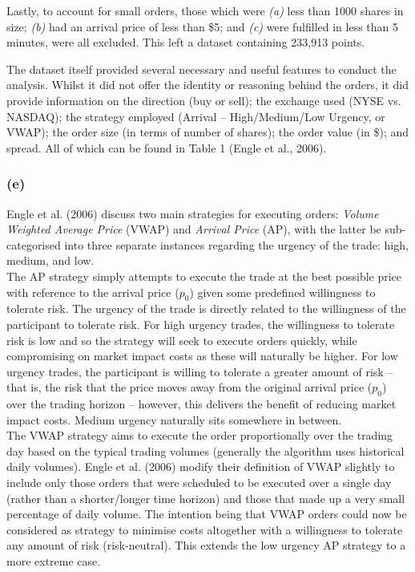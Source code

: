 \documentclass{article}
\begin{document}
Lastly, to account for small orders, those which were \textit{(a)} less than 1000 shares in size; \textit{(b)} had an arrival price of less than \$5; and \textit{(c)} were fulfilled in less than 5 minutes, were all excluded. This left a dataset containing 233,913 points. 

The dataset itself provided several necessary and useful features to conduct the analysis. Whilst it did not offer the identity or reasoning behind the orders, it did provide information on the direction (buy or sell); the exchange used (NYSE vs. NASDAQ); the strategy employed (Arrival – High/Medium/Low Urgency, or VWAP); the order size (in terms of number of shares); the order value (in \$); and spread. All of which can be found in Table 1 (Engle et al., 2006). \\


\subsubsection*{(e)}
Engle et al. (2006) discuss two main strategies for executing orders: \textit{Volume Weighted Average Price} (VWAP) and \textit{Arrival Price} (AP), with the latter be sub-categorised into three separate instances regarding the urgency of the trade: high, medium, and low. \\

The AP strategy simply attempts to execute the trade at the best possible price with reference to the arrival price ($p_0$) given some predefined willingness to tolerate risk. The urgency of the trade is directly related to the willingness of the participant to tolerate risk. For high urgency trades, the willingness to tolerate risk is low and so the strategy will seek to execute orders quickly, while compromising on market impact costs as these will naturally be higher. For low urgency trades, the participant is willing to tolerate a greater amount of risk – that is, the risk that the price moves away from the original arrival price ($p_0$) over the trading horizon – however, this delivers the benefit of reducing market impact costs. Medium urgency naturally sits somewhere in between. \\

The VWAP strategy aims to execute the order proportionally over the trading day based on the typical trading volumes (generally the algorithm uses historical daily volumes). Engle et al. (2006) modify their definition of VWAP slightly to include only those orders that were scheduled to be executed over a single day (rather than a shorter/longer time horizon) and those that made up a very small percentage of daily volume. The intention being that VWAP orders could now be considered as strategy to minimise costs altogether with a willingness to tolerate any amount of risk (risk-neutral). This extends the low urgency AP strategy to a more extreme case. \\
\end{document}
